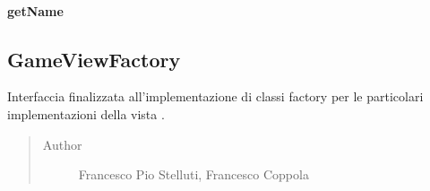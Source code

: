 \documentclass[letterpaper,10pt,italian,openany,oneside]{sphinxmanual}
\begin{document}
\begin{fulllineitems}
\label{\detokenize{source/it/unicam/cs/pa/mastermind/factories/DonaldKnuthBreakerFactory:it.unicam.cs.pa.mastermind.factories.DonaldKnuthBreakerFactory.getDescription()}}
\end{fulllineitems}



\paragraph{getName}
\label{\detokenize{source/it/unicam/cs/pa/mastermind/factories/DonaldKnuthBreakerFactory:getname}}

\begin{fulllineitems}
\label{\detokenize{source/it/unicam/cs/pa/mastermind/factories/DonaldKnuthBreakerFactory:it.unicam.cs.pa.mastermind.factories.DonaldKnuthBreakerFactory.getName()}}
\end{fulllineitems}



\subsection{GameViewFactory}
\label{\detokenize{source/it/unicam/cs/pa/mastermind/factories/GameViewFactory:gameviewfactory}}\label{\detokenize{source/it/unicam/cs/pa/mastermind/factories/GameViewFactory::doc}}

\begin{fulllineitems}
\label{\detokenize{source/it/unicam/cs/pa/mastermind/factories/GameViewFactory:it.unicam.cs.pa.mastermind.factories.GameViewFactory}}
Interfaccia finalizzata all’implementazione di classi factory per le particolari implementazioni della vista .
\begin{quote}\begin{description}
\item[{Author}] \leavevmode
Francesco Pio Stelluti, Francesco Coppola

\end{description}\end{quote}

\end{fulllineitems}
\end{document}
